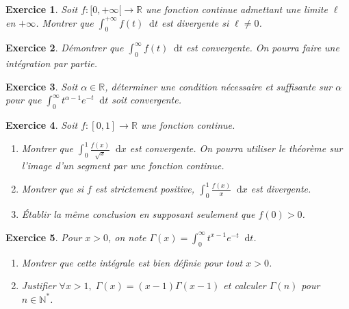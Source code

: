 \documentclass[a4paper,12pt,twocolumn]{article}
\theoremstyle{break}
\theoremstyle{sc}
\newtheorem{exo}{Exercice}
\theoremstyle{definition}
\theoremstyle{remark}
\newcommand{\diff}{\mathop{}\!\mathrm{d}}
\begin{document}





\begin{exo}
  Soit $f:[0,+\infty[\rightarrow\mathbb{R}$ une fonction continue admettant une
    limite $\ell$ en $+\infty$. Montrer que $\int_0^{+\infty}f(t)\diff t$ est
    divergente si $\ell\neq0$.
\end{exo}

\begin{exo}
  Démontrer que $\int_0^\infty f(t)\diff t$ est convergente. On pourra
  faire une intégration par partie.
\end{exo}

\begin{exo}
  Soit $\alpha\in\mathbb{R}$, déterminer une condition nécessaire et
  suffisante sur $\alpha$ pour que $\int_0^\infty
  t^{\alpha-1}e^{-t}\diff t$ soit convergente.
\end{exo}

\begin{exo}
  Soit $f:[0,1]\rightarrow\mathbb{R}$ une fonction continue.
  \begin{enumerate}
    \item Montrer que $\int_0^1\frac{f(x)}{\sqrt x}\diff x$ est
      convergente. On pourra utiliser le théorème sur l'image d'un
      segment par une fonction continue.
    \item Montrer que si $f$ est strictement positive,
      $\int_0^1\frac{f(x)}{x}\diff x$ est divergente.
    \item Établir la même conclusion en supposant seulement que
      $f(0)>0$.
  \end{enumerate}
\end{exo}

\begin{exo}
  Pour $x>0$, on note $\Gamma(x)=\int_0^\infty t^{x-1}e^{-t}\diff t$.
  \begin{enumerate}
    \item Montrer que cette intégrale est bien définie pour tout $x>0$.
    \item Justifier $\forall x>1,\; \Gamma(x)=(x-1)\Gamma(x-1)$ et calculer
      $\Gamma(n)$ pour $n\in\mathbb{N}^*$.
  \end{enumerate}
\end{exo}
\end{document}
